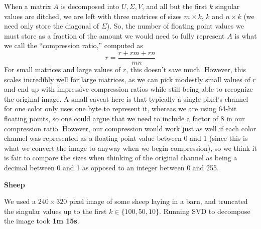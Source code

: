 \documentclass[12pt, letterpaper]{article}
\theoremstyle{definition}
\theoremstyle{remark}
\begin{document}
When a matrix $A$ is decomposed into $U, \Sigma, V$, and all but the first $k$ singular values are ditched, we are 
left with three matrices of sizes $m \times k$, $k$ and $n \times k$ (we need only store the diagonal of $\Sigma$).
So, the number of floating point values we must store as a fraction of the amount we would need to fully represent 
$A$ is what we call the ``compression ratio,'' computed as 
\[
    r = \frac{r + rm + rn}{mn}
\]
For small matrices and large values of $r$, this doesn't save much. However, this scales incredibly well for large matrices, 
as we can pick modestly small values of $r$ and end up with impressive compression ratios while still being able to recognize 
the original image. A small caveat here is that typically a single pixel's channel for one color only uses one byte to 
represent it, whereas we are using 64-bit floating points, so one could argue that we need to include a factor of 8 
in our compression ratio. However, our compression would work just as well if each color channel was represented 
as a floating point value between 0 and 1 (since this is what we convert the image to anyway when we begin 
compression), so we think it is fair to compare the sizes when thinking of the original channel as being a 
decimal between 0 and 1 as opposed to an integer between 0 and 255.

\begin{center}
    \textbf{Sheep}
\end{center}

We used a $240 \times 320$ pixel image of some sheep laying in a barn, and truncated the singular values
up to the first $k \in \{100, 50, 10\}$. Running SVD to decompose the image took \textbf{1m 15s}.
\end{document}
